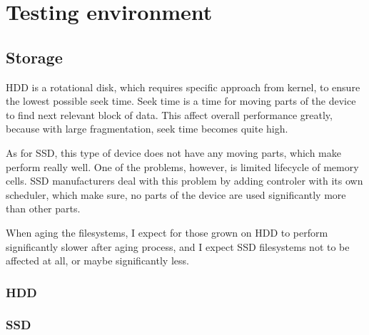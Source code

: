 \documentclass[
  color, %
  table, %
  lof,   %
  lot,   %
]{fithesis3}
\begin{document}




\chapter{Testing environment}
\section{Storage}
HDD is a rotational disk, which requires specific approach from kernel, to ensure the lowest possible seek time. Seek time is a time for moving parts of the device to find next relevant block of data. This affect overall performance greatly, because with large fragmentation, seek time becomes quite high.

As for SSD, this type of device does not have any moving parts, which make perform really well. One of the problems, however, is limited lifecycle of memory cells. SSD manufacturers deal with this problem by adding controler with its own scheduler, which make sure, no parts of the device are used significantly more than other parts.

When aging the filesystems, I expect for those grown on HDD to perform significantly slower after aging process, and I expect SSD filesystems not to be affected at all, or maybe significantly less.

\subsection{HDD}
\subsection{SSD}
\end{document}
